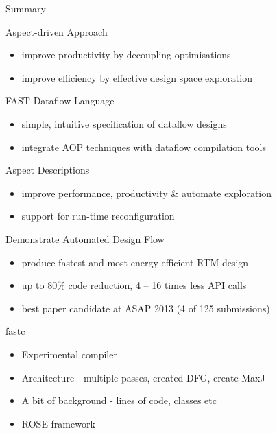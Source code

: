 \begin{frame}{Summary}

  \begin{beamerboxesrounded}{Aspect-driven Approach}
    \begin{itemize}
    \item improve productivity by decoupling optimisations
    \item improve efficiency by effective design space exploration
    \end{itemize}
  \end{beamerboxesrounded}

  \begin{beamerboxesrounded}{FAST Dataflow Language}
    \begin{itemize}
    \item simple, intuitive specification of dataflow designs
    \item integrate AOP techniques with dataflow compilation tools
    \end{itemize}
  \end{beamerboxesrounded}

  \begin{beamerboxesrounded}{Aspect Descriptions}
    \begin{itemize}
    \item improve performance, productivity \& automate exploration
    \item support for run-time reconfiguration
    \end{itemize}
  \end{beamerboxesrounded}

  \begin{beamerboxesrounded}{Demonstrate Automated Design Flow}
    \begin{itemize}
    \item produce fastest and most energy efficient RTM design
    \item up to 80\% code reduction, 4 -- 16 times less API calls
    \item best paper candidate at ASAP 2013 (4 of 125 submissions)
    \end{itemize}
  \end{beamerboxesrounded}

\end{frame}

\begin{frame}
  \begin{beamerboxesrounded}{fastc}
    \begin{itemize}
    \item Experimental compiler
    \item Architecture - multiple passes, created DFG, create MaxJ
    \item A bit of background - lines of code, classes etc
    \item ROSE framework
    \end{itemize}
  \end{beamerboxesrounded}
\end{frame}

